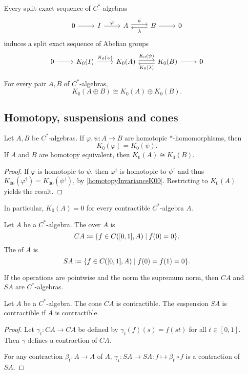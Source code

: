 \begin{proposition}
Every split exact sequence of $C^*$-algebras
\[ \begin{tikzcd}
0 \rar & I \rar{\varphi} & A \rar[shift left]{\psi} & B \rar \lar[shift left]{\lambda} & 0
\end{tikzcd} \]
induces a split exact sequence of Abelian groups
\[ \begin{tikzcd}
0 \rar & K_0(I) \rar{K_0(\varphi)} & K_0(A) \rar[shift left]{K_0(\psi)} & K_0(B) \rar \lar[shift left]{K_0(\lambda)} & 0
\end{tikzcd} \]
\end{proposition}

\begin{proposition}
For every pair $A,B$ of $C^*$-algebras,
\[ K_0(A\oplus B) \cong K_0(A)\oplus K_0(B).  \]
\end{proposition}

\subsection{Homotopy, suspensions and cones}
\begin{proposition}
Let $A,B$ be $C^*$-algebras. If $\varphi,\psi:A\to B$ are homotopic $*$-homomorphisms, then 
\[ K_{0}(\varphi) = K_{0}(\psi). \]
If $A$ and $B$ are homotopy equivalent, then $K_{0}(A)\cong K_{0}(B)$.
\end{proposition}
\begin{proof}
If $\varphi$ is homotopic to $\psi$, then $\varphi^\dagger$ is homotopic to $\psi^\dagger$ and thus $K_{00}(\varphi^\dagger) = K_{00}(\psi^\dagger)$, by \ref{homotopyInvarianceK00}. Restricting to $K_0(A)$ yields the result.
\end{proof}
In particular, $K_0(A) = 0$ for every contractible $C^*$-algebra $A$.

\begin{definition}
Let $A$ be a $C^*$-algebra. The  over $A$ is
\[ CA \defeq \setbuilder{f\in C([0,1], A)}{f(0) = 0}. \]
The  of $A$ is
\[ SA \defeq \setbuilder{f\in C([0,1], A)}{f(0) = f(1) = 0}. \]
\end{definition}

\begin{lemma}
If the operations are pointwise and the norm the supremum norm, then $CA$ and $SA$ are $C^*$-algebras.
\end{lemma}

\begin{lemma}
Let $A$ be a $C^*$-algebra. The cone $CA$ is contractible. The suspension $SA$ is contractible if $A$ is contractible.
\end{lemma}
\begin{proof}
Let $\gamma_t: CA\to CA$ be defined by $\gamma_t(f)(s) = f(st)$ for all $t\in [0,1]$. Then $\gamma$ defines a contraction of $CA$.

For any contraction $\beta_t: A\to A$ of $A$, $\gamma_t: SA \to SA: f\mapsto \beta_t\circ f$ is a contraction of $SA$.
\end{proof}

